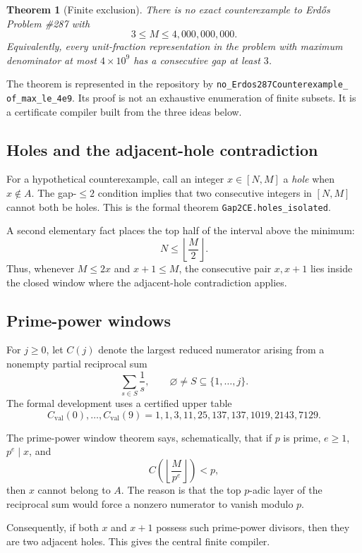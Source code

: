 \documentclass[11pt]{article}
\newtheorem{theorem}{Theorem}[section]
\theoremstyle{definition}
\newcommand{\1}{\mathbf 1}
\begin{document}
\begin{theorem}[Finite exclusion]
There is no exact counterexample to Erd\H{o}s Problem \#287 with
\[
3\le M\le4{,}000{,}000{,}000.
\]
Equivalently, every unit-fraction representation in the problem with maximum denominator
at most $4\times10^9$ has a consecutive gap at least $3$.
\end{theorem}

The theorem is represented in the repository by
\texttt{no\_Erdos287Counterexample\_}\\\texttt{of\_max\_le\_4e9}.  Its proof is not an exhaustive
enumeration of finite subsets.  It is a certificate compiler built from the three ideas
below.

\subsection{Holes and the adjacent-hole contradiction}

For a hypothetical counterexample, call an integer $x\in[N,M]$ a \emph{hole} when
$x\notin A$.  The gap-$\le2$ condition implies that two consecutive integers in
$[N,M]$ cannot both be holes.  This is the formal theorem
\texttt{Gap2CE.holes\_isolated}.

A second elementary fact places the top half of the interval above the minimum:
\[
N\le\left\lfloor\frac M2\right\rfloor.
\]
Thus, whenever $M\le2x$ and $x+1\le M$, the consecutive pair $x,x+1$ lies inside the
closed window where the adjacent-hole contradiction applies.

\subsection{Prime-power windows}

For $j\ge0$, let $C(j)$ denote the largest reduced numerator arising from a nonempty
partial reciprocal sum
\[
\sum_{s\in S}\frac1s,\qquad \varnothing\ne S\subseteq\{1,\dots,j\}.
\]
The formal development uses a certified upper table
\[
C_{\mathrm{val}}(0),\dots,C_{\mathrm{val}}(9)
=1,1,3,11,25,137,137,1019,2143,7129.
\]

The prime-power window theorem says, schematically, that if $p$ is prime, $e\ge1$,
$p^e\mid x$, and
\[
C\!\left(\left\lfloor\frac M{p^e}\right\rfloor\right)<p,
\]
then $x$ cannot belong to $A$.  The reason is that the top $p$-adic layer of the reciprocal
sum would force a nonzero numerator to vanish modulo $p$.

Consequently, if both $x$ and $x+1$ possess such prime-power divisors, then they are two
adjacent holes.  This gives the central finite compiler.
\end{document}
